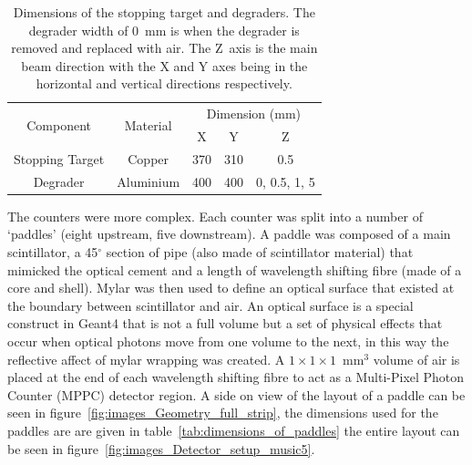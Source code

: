 \begin{table}
  \begin{center}
  \begin{tabular}{c | c | c | c | c}
    \multirow{2}{*}{Component}
                     &  \multirow{2}{*}{Material} 
                                   &  \multicolumn{3}{c}{Dimension (mm)}  \\
                     &             &   X   &   Y   &       Z       \\
    \hline
    Stopping Target  &  Copper     &  370  &  310  &      0.5      \\
    Degrader         &  Aluminium  &  400  &  400  & 0, 0.5, 1, 5  \\
    
  \end{tabular}
  \end{center}
  \caption{Dimensions of the stopping target and degraders. The degrader width of 0~mm is when the degrader is removed and replaced with air. The Z~axis is the main beam direction with the X and Y axes being in the horizontal and vertical directions respectively.}
  \label{tab:st_and_deg_dimensions}
\end{table}

The counters were more complex. Each counter was split into a number of `paddles' (eight upstream, five downstream). A paddle was composed of a main scintillator, a 45\(^{\circ}\) section of pipe (also made of scintillator material) that mimicked the optical cement and a length of wavelength shifting fibre (made of a core and shell). Mylar was then used to define an optical surface that existed at the boundary between scintillator and air. An optical surface is a special construct in Geant4 that is not a full volume but a set of physical effects that occur when optical photons move from one volume to the next, in this way the reflective affect of mylar wrapping was created. A \(1\times1\times1\)~mm\(^3\) volume of air is placed at the end of each wavelength shifting fibre to act as a Multi-Pixel Photon Counter (MPPC) detector region. A side on view of the layout of a paddle can be seen in figure~\ref{fig:images_Geometry_full_strip}, the dimensions used for the paddles are are given in table~\ref{tab:dimensions_of_paddles} the entire layout can be seen in figure~\ref{fig:images_Detector_setup_music5}. 

